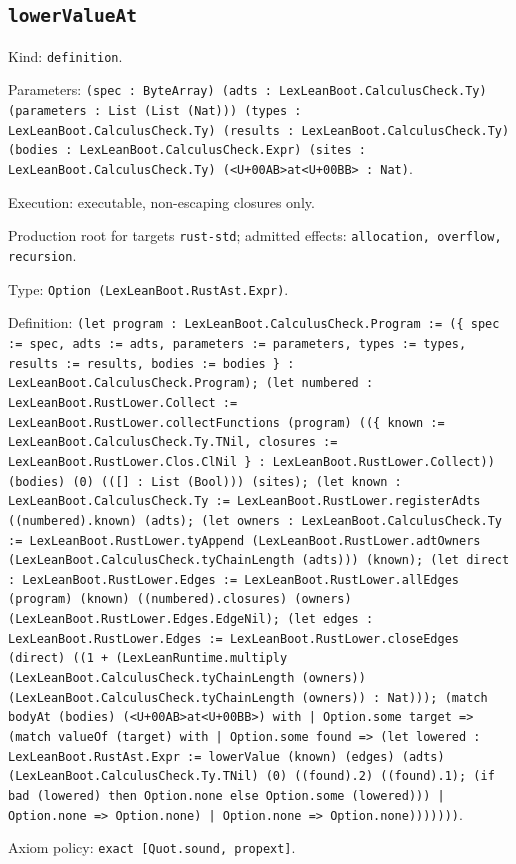 \documentclass[11pt]{article}
\begin{document}
\subsection*{\texttt{lowerValueAt}}
\noindent Kind: \texttt{definition}.\par
\noindent Parameters: \texttt{(spec : ByteArray) (adts : LexLeanBoot.CalculusCheck.Ty) (parameters : List (List (Nat))) (types : LexLeanBoot.CalculusCheck.Ty) (results : LexLeanBoot.CalculusCheck.Ty) (bodies : LexLeanBoot.CalculusCheck.Expr) (sites : LexLeanBoot.CalculusCheck.Ty) (<U+00AB>at<U+00BB> : Nat)}.\par
\noindent Execution: executable, non-escaping closures only.\par
\noindent Production root for targets \texttt{rust-std}; admitted effects: \texttt{allocation, overflow, recursion}.\par
\noindent Type: \texttt{Option (LexLeanBoot.RustAst.Expr)}.\par
\noindent Definition: \texttt{(let program : LexLeanBoot.CalculusCheck.Program := (\{ spec := spec, adts := adts, parameters := parameters, types := types, results := results, bodies := bodies \} : LexLeanBoot.CalculusCheck.Program); (let numbered : LexLeanBoot.RustLower.Collect := LexLeanBoot.RustLower.collectFunctions (program) ((\{ known := LexLeanBoot.CalculusCheck.Ty.TNil, closures := LexLeanBoot.RustLower.Clos.ClNil \} : LexLeanBoot.RustLower.Collect)) (bodies) (0) (([] : List (Bool))) (sites); (let known : LexLeanBoot.CalculusCheck.Ty := LexLeanBoot.RustLower.registerAdts ((numbered).known) (adts); (let owners : LexLeanBoot.CalculusCheck.Ty := LexLeanBoot.RustLower.tyAppend (LexLeanBoot.RustLower.adtOwners (LexLeanBoot.CalculusCheck.tyChainLength (adts))) (known); (let direct : LexLeanBoot.RustLower.Edges := LexLeanBoot.RustLower.allEdges (program) (known) ((numbered).closures) (owners) (LexLeanBoot.RustLower.Edges.EdgeNil); (let edges : LexLeanBoot.RustLower.Edges := LexLeanBoot.RustLower.closeEdges (direct) ((1 + (LexLeanRuntime.multiply (LexLeanBoot.CalculusCheck.tyChainLength (owners)) (LexLeanBoot.CalculusCheck.tyChainLength (owners)) : Nat))); (match bodyAt (bodies) (<U+00AB>at<U+00BB>) with | Option.some target => (match valueOf (target) with | Option.some found => (let lowered : LexLeanBoot.RustAst.Expr := lowerValue (known) (edges) (adts) (LexLeanBoot.CalculusCheck.Ty.TNil) (0) ((found).2) ((found).1); (if bad (lowered) then Option.none else Option.some (lowered))) | Option.none => Option.none) | Option.none => Option.none)))))))}.\par
\noindent Axiom policy: \texttt{exact [Quot.sound, propext]}.\par
\end{document}
